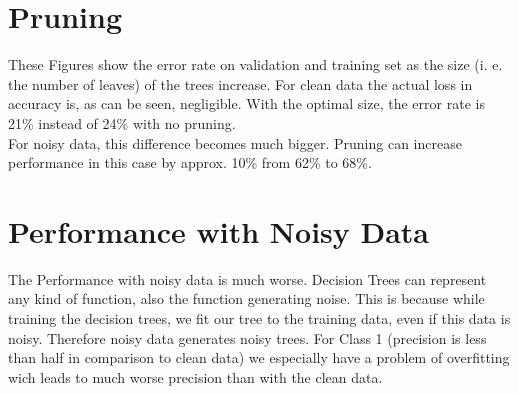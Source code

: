 \documentclass{article}
\begin{document}
\section{Pruning}
\begin{figure}
\centering
{}
\end{figure}

These Figures show the error rate on validation and training set as the size (i. e. the number of leaves) of the trees increase.
For clean data the actual loss in accuracy is, as can be seen, negligible. With the optimal size, the error rate is 21\% instead of 24\% with no pruning.\\
For noisy data, this difference becomes much bigger. Pruning can increase performance in this case by approx. 10\% from 62\% to 68\%.

\section{Performance with Noisy Data}
The Performance with noisy data is much worse. Decision Trees can represent any kind of function, also the function generating noise. This is because while training the decision trees, we fit our tree to the training data, even if this data is noisy. Therefore noisy data generates noisy trees.
For Class 1 (precision is less than half in comparison to clean data) we especially have a problem of overfitting wich leads to much worse precision than with the clean data.
\end{document}

